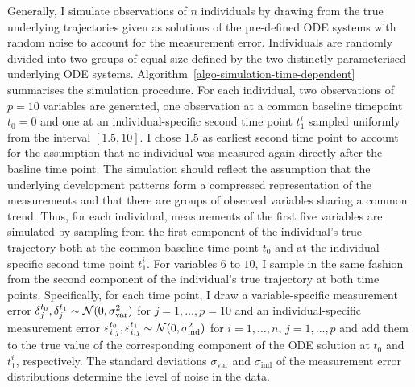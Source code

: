 Generally, I simulate observations of $n$ individuals by drawing from the true underlying trajectories given as solutions of the pre-defined ODE systems with random noise to account for the measurement error. 
Individuals are randomly divided into two groups of equal size defined by the two distinctly parameterised underlying ODE systems. Algorithm~\ref{algo-simulation-time-dependent} summarises the simulation procedure. 
For each individual, two observations of $p=10$ variables are generated, one observation at a common baseline timepoint $t_0 = 0$ and one at an individual-specific second time point $t_1^i$ sampled uniformly from the interval $[1.5,10]$.
I chose $1.5$ as earliest second time point to account for the assumption that no individual was measured again directly after the basline time point. 
The simulation should reflect the assumption that the underlying development patterns form a compressed representation of the measurements and that there are groups of observed variables sharing a common trend. Thus, for each individual, measurements of the first five variables are simulated by sampling from the first component of the individual's true trajectory both at the common baseline time point $t_0$ and at the individual-specific second time point $t_1^i$. For variables $6$ to $10$, I sample in the same fashion from the second component of the individual's true trajectory at both time points. 
Specifically, for each time point, I draw a variable-specific measurement error $\delta_{j}^{t_0}, \delta_{j}^{t_1} \sim \mathcal{N}(0,\sigma_{\mathrm{var}}^2)$ for $j=1,\dots, p=10$ and an individual-specific measurement error $\varepsilon_{i,j}^{t_0}, \varepsilon_{i,j}^{t_1} \sim \mathcal{N}(0,\sigma_{\mathrm{ind}}^2)$ for $i=1,\dots, n$, $j=1,\dots, p$ and add them to the true value of the corresponding component of the ODE solution at $t_0$ and $t_1^i$, respectively. 
The standard deviations $\sigma_{\mathrm{var}}$ and $\sigma_{\mathrm{ind}}$ of the measurement error distributions determine the level of noise in the data. 
